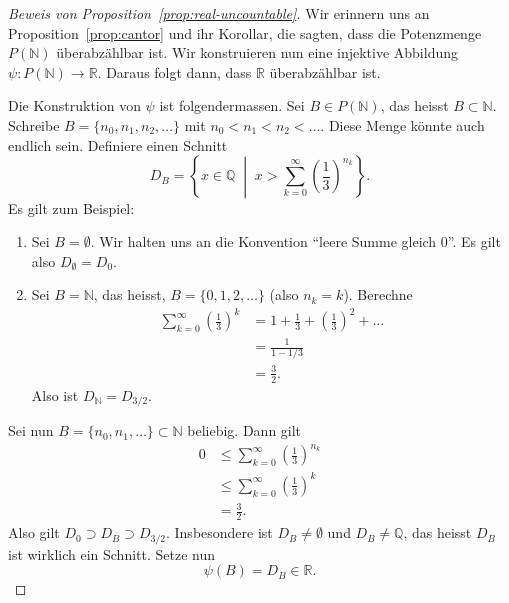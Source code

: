 \documentclass[../main.tex]{subfiles}
\begin{document}
\begin{proof}[Beweis von Proposition~\ref{prop:real-uncountable}]
  Wir erinnern uns an Proposition~\ref{prop:cantor} und ihr Korollar,
  die sagten, dass die Potenzmenge $P(\mathbb N )$ überabzählbar ist.
  Wir konstruieren nun eine injektive Abbildung
  $\psi \colon P(\mathbb N) \to \mathbb R$.
  Daraus folgt dann, dass $\mathbb R$ überabzählbar ist.

  Die Konstruktion von $\psi$ ist folgendermassen.
  Sei $B \in P(\mathbb N)$, das heisst $B \subset \mathbb N$.
  Schreibe $B = \{n_{0}, n_{1}, n_{2}, \dots\}$ mit $n_{0} < n_{1} < n_{2} < \dots$.
  Diese Menge könnte auch endlich sein.
  Definiere einen Schnitt
  \[
    D_{B} = \left\{x \in \mathbb Q \; \middle| \; x > \sum_{k=0}^{\infty}
      {\left( \frac{1}{3}\right)}^{n_{k}}
    \right\}.
  \]
  Es gilt zum Beispiel:
  \begin{enumerate}[(1)]
    \item Sei $B = \emptyset$.
      Wir halten uns an die Konvention ``leere Summe gleich $0$''. Es gilt also
      $D_{\emptyset} = D_{0}$.
    \item Sei $B = \mathbb N$, das heisst, $B = \{0, 1, 2, \dots\}$
      (also $n_{k} = k$). Berechne
      \begin{align*}
        \sum_{k=0}^{\infty}
        {\left(\frac{1}{3}\right)}^{k}
        &= 1 + \frac{1}{3} + {\left(\frac{1}{3}\right)}^{2} + \dots \\
        &= \frac{1}{1 - 1/3}
          \\ &= \frac{3}{2}.
      \end{align*}
      Also ist $D_{\mathbb N} = D_{3/2}$.
  \end{enumerate}

Sei nun $B = \{n_{0}, n_{1}, \dots \} \subset \mathbb N$ beliebig.
Dann gilt
\begin{align*}
  0
  &\leq \sum_{k=0}^{\infty}{\left(\frac{1}{3}\right)}^{n_{k}} \\
  &\leq \sum_{k=0}^{\infty} {\left(\frac{1}{3}\right)}^{k} \\
  &= \frac{3}{2}.
\end{align*}
Also gilt $D_{0} \supset D_{B} \supset D_{3/2}$.
Insbesondere ist $D_{B} \neq \emptyset$ und $D_{B} \neq \mathbb Q$, das heisst
$D_{B}$ ist wirklich ein Schnitt.
Setze nun
\[\psi(B) = D_{B} \in \mathbb R.\]


\end{proof}
\end{document}
